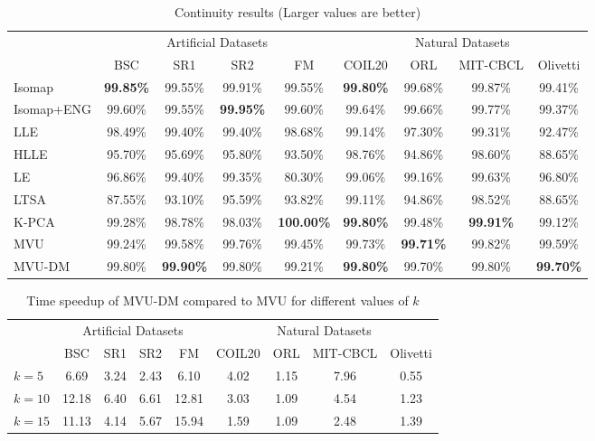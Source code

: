 \documentclass{article} %
\begin{document}
\begin{table}[t]
\caption{Continuity results (Larger values are better)}
\label{tab:continuity}
\begin{center}
\begin{tabular}{l|c|c|c|c||c|c|c|c}
\hline
\multicolumn{1}{c|}{} & \multicolumn{4}{c||}{Artificial Datasets} & \multicolumn{4}{c}{Natural Datasets} \\
                     & BSC & SR1 & SR2 & FM & COIL20 & ORL & MIT-CBCL & Olivetti \\
\hline
Isomap            & \textbf{99.85\%} & 99.55\% & 99.91\% & 99.55\% & \textbf{99.80\%} & 99.68\% & 99.87\% & 99.41\% \\
Isomap+ENG            & 99.60\% & 99.55\% & \textbf{99.95\%} & 99.60\% & 99.64\% & 99.66\% & 99.77\% & 99.37\% \\
LLE            & 98.49\% & 99.40\% & 99.40\% & 98.68\% & 99.14\% & 97.30\% & 99.31\% & 92.47\% \\
HLLE            & 95.70\% & 95.69\% & 95.80\% & 93.50\% & 98.76\% & 94.86\% & 98.60\% & 88.65\% \\
LE            & 96.86\% & 99.40\% & 99.35\% & 80.30\% & 99.06\% & 99.16\% & 99.63\% & 96.80\% \\
LTSA            & 87.55\% & 93.10\% & 95.59\% & 93.82\% & 99.11\% & 94.86\% & 98.52\% & 88.65\% \\
K-PCA            & 99.28\% & 98.78\% & 98.03\% & \textbf{100.00\%} & \textbf{99.80\%} & 99.48\% & \textbf{99.91\%} & 99.12\% \\
\hline
MVU            & 99.24\% & 99.58\% & 99.76\% & 99.45\% & 99.73\% & \textbf{99.71\%} & 99.82\% & 99.59\% \\
MVU-DM            & 99.80\% & \textbf{99.90\%} & 99.80\% & 99.21\% & \textbf{99.80\%} & 99.70\% & 99.80\% & \textbf{99.70\%} \\
\hline
\end{tabular}
\end{center}
\end{table}




\begin{table}[t]
\caption{Time speedup of MVU-DM compared to MVU for different values of $k$}
\label{tab:speedup}
\begin{center}
\begin{tabular}{l|c|c|c|c||c|c|c|c}
\hline
\multicolumn{1}{c|}{} & \multicolumn{4}{c||}{Artificial Datasets} & \multicolumn{4}{c}{Natural Datasets} \\
     & BSC & SR1 & SR2 & FM & COIL20 & ORL & MIT-CBCL & Olivetti \\ \hline
    $k=5$ & 6.69 & 3.24 & 2.43 & 6.10 & 4.02 & 1.15 & 7.96 & 0.55 \\ \hline
    $k=10$ & 12.18 & 6.40 & 6.61 & 12.81 & 3.03 & 1.09 & 4.54 & 1.23 \\ \hline
    $k=15$ & 11.13 & 4.14 & 5.67 & 15.94 & 1.59 & 1.09 & 2.48 & 1.39 \\ \hline
\end{tabular}
\end{center}
\end{table}
\end{document}
